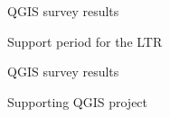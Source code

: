 \begin{frame}{QGIS survey results}
	\begin{block}{Support period for the LTR}
	\end{block}
\end{frame}

\begin{frame}{QGIS survey results}
	\begin{block}{Supporting QGIS project}
	\end{block}
\end{frame}

